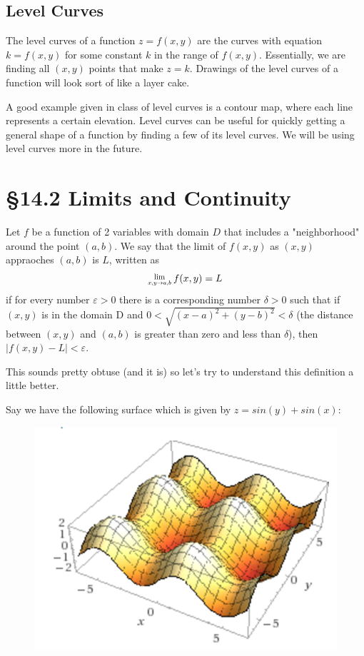 \documentclass[12 pt]{article}
\begin{document}
        \subsection{Level Curves}

        \begin{def*}
            The level curves of a function $z=f(x,y)$ are the curves with equation $k=f(x,y)$ for some constant $k$ in the range of $f(x,y)$. Essentially, we are finding all $(x,y)$ points that make $z=k$. Drawings of the level curves of a function will look sort of like a layer cake.
        \end{def*}
        A good example given in class of level curves is a contour map, where each line represents a certain elevation. Level curves can be useful for quickly getting a general shape of a function by finding a few of its level curves. We will be using level curves more in the future.
    \section{\S 14.2 Limits and Continuity}
        \begin{def*}
            Let $f$ be a function of 2 variables with domain $D$ that includes a "neighborhood" around the point $(a,b)$. We say that the limit of $f(x,y)$ as $(x,y)$ appraoches $(a,b)$ is $L$, written as
            $$\Lim{x,y\rightarrow a,b}f(x,y)=L$$
            if for every number $\varepsilon>0$ there is a corresponding number $\delta>0$ such that if $(x,y)$ is in the domain D and $0<\sqrt{(x-a)^2+(y-b)^2}<\delta$ (the distance between $(x,y)$ and $(a,b)$ is greater than zero and less than $\delta$), then $\lvert f(x,y)-L\rvert<\varepsilon$.
        \end{def*}

        This sounds pretty obtuse (and it is) so let's try to understand this definition a little better.

        Say we have the following surface which is given by $z=sin(y)+sin(x)$:
        \begin{figure}[!h]
            \centering
            \includegraphics{z=sin(y)+sin(x).png}
        \end{figure}
\end{document}
